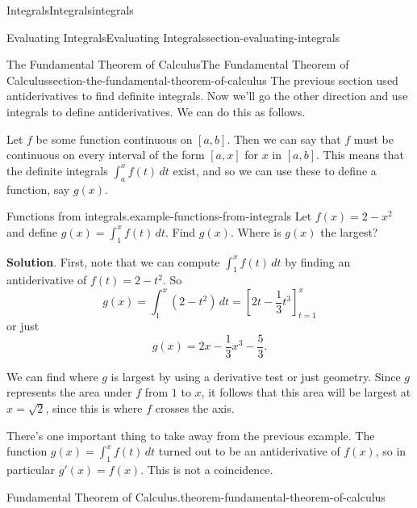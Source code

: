 \documentclass[oneside,10pt,]{book}
\numberwithin{equation}{section}
\begin{document}
\begin{chapterptx}{Integrals}{}{Integrals}{}{}{integrals}
\begin{sectionptx}{Evaluating Integrals}{}{Evaluating Integrals}{}{}{section-evaluating-integrals}
\end{sectionptx}
%
%
\typeout{************************************************}
\typeout{************************************************}
%
\begin{sectionptx}{The Fundamental Theorem of Calculus}{}{The Fundamental Theorem of Calculus}{}{}{section-the-fundamental-theorem-of-calculus}
\hypertarget{p-460}{}%
The previous section used antiderivatives to find definite integrals. Now we'll go the other direction and use integrals to define antiderivatives. We can do this as follows.%
\par
\hypertarget{p-461}{}%
Let \(f\) be some function continuous on \([a,b]\). Then we can say that \(f\) must be continuous on every interval of the form \([a,x]\) for \(x\) in \([a,b]\). This means that the definite integrals \(\int_{a}^{x}f(t)\,dt\) exist, and so we can use these to define a function, say \(g(x)\).%
\begin{example}{Functions from integrals.}{example-functions-from-integrals}%
\hypertarget{p-462}{}%
Let \(f(x) = 2 - x^{2}\) and define \(g(x) = \int_{1}^{x}f(t)\,dt\). Find \(g(x)\). Where is \(g(x)\) the largest?%
\par\smallskip%
\noindent\textbf{Solution}.\hypertarget{solution-101}{}\quad%
\hypertarget{p-463}{}%
First, note that we can compute \(\int_{1}^{x}f(t)\,dt\) by finding an antiderivative of \(f(t) = 2 - t^{2}\). So%
\begin{equation*}
g(x) = \int_{1}^{x}(2-t^{2})\,dt = \left[2t-\frac{1}{3}t^{3}\right]_{t=1}^{x}
\end{equation*}
or just%
\begin{equation*}
g(x) = 2x - \frac{1}{3}x^{3} - \frac{5}{3}.
\end{equation*}
%
\par
\hypertarget{p-464}{}%
We can find where \(g\) is largest by using a derivative test or just geometry. Since \(g\) represents the area under \(f\) from \(1\) to \(x\), it follows that this area will be largest at \(x=\sqrt{2}\), since this is where \(f\) crosses the axis.%
\end{example}
\hypertarget{p-465}{}%
There's one important thing to take away from the previous example. The function \(g(x) = \int_{1}^{x}f(t)\,dt\) turned out to be an antiderivative of \(f(x)\), so in particular \(g'(x) = f(x)\). This is not a coincidence.%
\begin{theorem}{Fundamental Theorem of Calculus.}{}{theorem-fundamental-theorem-of-calculus}%

\end{theorem}
\end{sectionptx}
\end{chapterptx}
\end{document}
